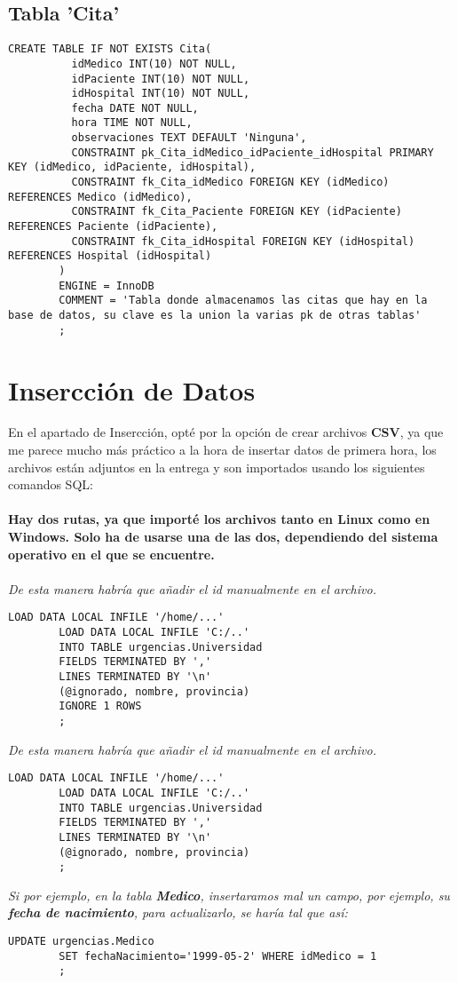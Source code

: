 \documentclass{article}
\begin{document}
    \subsection{Tabla 'Cita'}
      \begin{lstlisting}[style=C]
        CREATE TABLE IF NOT EXISTS Cita(
          idMedico INT(10) NOT NULL,
          idPaciente INT(10) NOT NULL,
          idHospital INT(10) NOT NULL,
          fecha DATE NOT NULL,
          hora TIME NOT NULL,
          observaciones TEXT DEFAULT 'Ninguna',
          CONSTRAINT pk_Cita_idMedico_idPaciente_idHospital PRIMARY KEY (idMedico, idPaciente, idHospital),
          CONSTRAINT fk_Cita_idMedico FOREIGN KEY (idMedico) REFERENCES Medico (idMedico),
          CONSTRAINT fk_Cita_Paciente FOREIGN KEY (idPaciente) REFERENCES Paciente (idPaciente),
          CONSTRAINT fk_Cita_idHospital FOREIGN KEY (idHospital) REFERENCES Hospital (idHospital)
        )
        ENGINE = InnoDB
        COMMENT = 'Tabla donde almacenamos las citas que hay en la base de datos, su clave es la union la varias pk de otras tablas'
        ;
      \end{lstlisting}
  \newpage
    \section{Insercción de Datos}
      En el apartado de Insercción, opté por la opción de crear archivos \textbf{CSV}, ya que me parece mucho más práctico a la hora de 
      insertar datos de primera hora, los archivos están adjuntos en la entrega y son importados usando los siguientes comandos SQL:
      \\
      \\
      \textbf{Hay dos rutas, ya que importé los archivos tanto en Linux como en Windows. Solo ha de usarse una de las dos, dependiendo 
      del sistema operativo en el que se encuentre.}
      \\
      \\
      \textit{De esta manera habría que añadir el id manualmente en el archivo.}
      \begin{lstlisting}[style=C]
        LOAD DATA LOCAL INFILE '/home/...'
        LOAD DATA LOCAL INFILE 'C:/..'
        INTO TABLE urgencias.Universidad
        FIELDS TERMINATED BY ','
        LINES TERMINATED BY '\n'
        (@ignorado, nombre, provincia)
        IGNORE 1 ROWS
        ;
      \end{lstlisting}
      \textit{De esta manera habría que añadir el id manualmente en el archivo.}
      \begin{lstlisting}[style=C]
        LOAD DATA LOCAL INFILE '/home/...'
        LOAD DATA LOCAL INFILE 'C:/..'
        INTO TABLE urgencias.Universidad
        FIELDS TERMINATED BY ','
        LINES TERMINATED BY '\n'
        (@ignorado, nombre, provincia)
        ;
      \end{lstlisting}
      \textit{Si por ejemplo, en la tabla \textbf{Medico}, insertaramos mal un campo, por ejemplo, su \textbf{fecha de nacimiento}, para actualizarlo, se 
      haría tal que así:}
      \begin{lstlisting}[style=C]
        UPDATE urgencias.Medico
        SET fechaNacimiento='1999-05-2' WHERE idMedico = 1
        ;
      \end{lstlisting}
  \newpage
\end{document}
